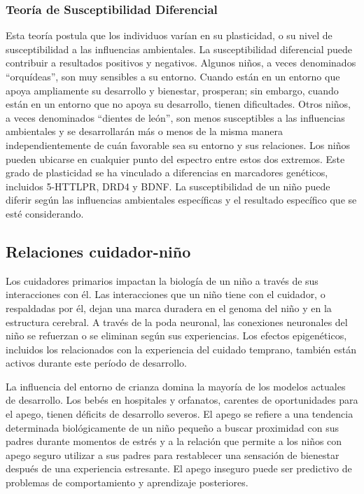 \documentclass[11pt,letterpaper]{report}
\begin{document}
\subsubsection{Teoría de Susceptibilidad Diferencial}
Esta teoría postula que los individuos varían en su plasticidad, o su nivel de
susceptibilidad a las influencias ambientales. \cite{Belsky2021} La
susceptibilidad diferencial puede contribuir a resultados positivos y
negativos. Algunos niños, a veces denominados ``orquídeas'', son muy sensibles
a su entorno. Cuando están en un entorno que apoya ampliamente su desarrollo y
bienestar, prosperan; sin embargo, cuando están en un entorno que no apoya su
desarrollo, tienen dificultades. Otros niños, a veces denominados ``dientes de
león'', son menos susceptibles a las influencias ambientales y se
desarrollarán más o menos de la misma manera independientemente de cuán
favorable sea su entorno y sus relaciones. Los niños pueden ubicarse en
cualquier punto del espectro entre estos dos extremos. Este grado de
plasticidad se ha vinculado a diferencias en marcadores genéticos, incluidos
5-HTTLPR, DRD4 y BDNF. \cite{Belsky2021} La susceptibilidad de un niño puede
diferir según las influencias ambientales específicas y el resultado específico
que se esté considerando. \cite{Feldman3}

\subsection{Relaciones cuidador-niño}
Los cuidadores primarios impactan la biología de un niño a través de sus
interacciones con él. Las interacciones que un niño tiene con el cuidador, o
respaldadas por él, dejan una marca duradera en el genoma del niño y en la
estructura cerebral. A través de la poda neuronal, las conexiones neuronales
del niño se refuerzan o se eliminan según sus experiencias. Los efectos
epigenéticos, incluidos los relacionados con la experiencia del cuidado
temprano, también están activos durante este período de desarrollo.
\cite{Roth2011}

La influencia del entorno de crianza domina la mayoría de los modelos actuales
de desarrollo. Los bebés en hospitales y orfanatos, carentes de oportunidades
para el apego, tienen déficits de desarrollo severos. El apego se refiere a
una tendencia determinada biológicamente de un niño pequeño a buscar
proximidad con sus padres durante momentos de estrés y a la relación que
permite a los niños con apego seguro utilizar a sus padres para restablecer una
sensación de bienestar después de una experiencia estresante. El apego inseguro
puede ser predictivo de problemas de comportamiento y aprendizaje posteriores.
\cite{Nelson19}
\end{document}
